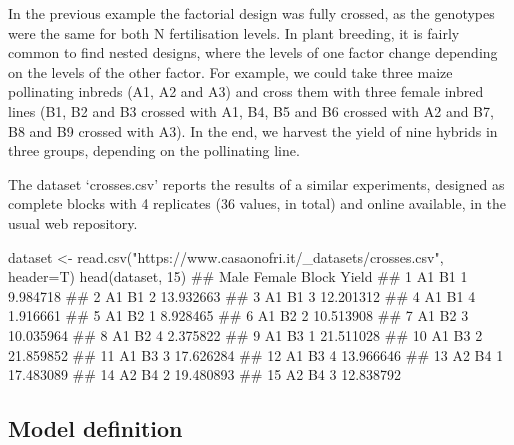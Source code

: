 \documentclass[a4paper,12pt,oneside]{book}
\newenvironment{Shaded}{\begin{snugshade}}{\end{snugshade}}
\newcommand{\DecValTok}[1]{#1}
\newcommand{\StringTok}[1]{#1}
\newcommand{\DocumentationTok}[1]{#1}
\newcommand{\OtherTok}[1]{#1}
\newcommand{\FunctionTok}[1]{#1}
\newcommand{\AttributeTok}[1]{#1}
\newcommand{\NormalTok}[1]{#1}
\begin{document}
In the previous example the factorial design was fully crossed, as the genotypes were the same for both N fertilisation levels. In plant breeding, it is fairly common to find nested designs, where the levels of one factor change depending on the levels of the other factor. For example, we could take three maize pollinating inbreds (A1, A2 and A3) and cross them with three female inbred lines (B1, B2 and B3 crossed with A1, B4, B5 and B6 crossed with A2 and B7, B8 and B9 crossed with A3). In the end, we harvest the yield of nine hybrids in three groups, depending on the pollinating line.

The dataset `crosses.csv' reports the results of a similar experiments, designed as complete blocks with 4 replicates (36 values, in total) and online available, in the usual web repository.

\vspace{12pt}

\begin{Shaded}
\begin{Highlighting}[]
\NormalTok{dataset }\OtherTok{\textless{}{-}} \FunctionTok{read.csv}\NormalTok{(}\StringTok{"https://www.casaonofri.it/\_datasets/crosses.csv"}\NormalTok{, }\AttributeTok{header=}\NormalTok{T)}
\FunctionTok{head}\NormalTok{(dataset, }\DecValTok{15}\NormalTok{)}
\DocumentationTok{\#\#    Male Female Block     Yield}
\DocumentationTok{\#\# 1    A1     B1     1  9.984718}
\DocumentationTok{\#\# 2    A1     B1     2 13.932663}
\DocumentationTok{\#\# 3    A1     B1     3 12.201312}
\DocumentationTok{\#\# 4    A1     B1     4  1.916661}
\DocumentationTok{\#\# 5    A1     B2     1  8.928465}
\DocumentationTok{\#\# 6    A1     B2     2 10.513908}
\DocumentationTok{\#\# 7    A1     B2     3 10.035964}
\DocumentationTok{\#\# 8    A1     B2     4  2.375822}
\DocumentationTok{\#\# 9    A1     B3     1 21.511028}
\DocumentationTok{\#\# 10   A1     B3     2 21.859852}
\DocumentationTok{\#\# 11   A1     B3     3 17.626284}
\DocumentationTok{\#\# 12   A1     B3     4 13.966646}
\DocumentationTok{\#\# 13   A2     B4     1 17.483089}
\DocumentationTok{\#\# 14   A2     B4     2 19.480893}
\DocumentationTok{\#\# 15   A2     B4     3 12.838792}
\end{Highlighting}
\end{Shaded}

\hypertarget{model-definition-3}{%
\subsection{Model definition}\label{model-definition-3}}
\end{document}
